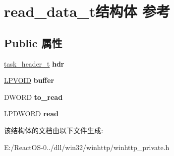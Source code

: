 \hypertarget{structread__data__t}{}\section{read\+\_\+data\+\_\+t结构体 参考}
\label{structread__data__t}
\subsection*{Public 属性}
\begin{DoxyCompactItemize}
\item 
\mbox{\label{structread__data__t_a24a4f40a354f6f671183c254c717ccd1}} 
\hyperlink{structtask__header__t}{task\+\_\+header\+\_\+t} {\bfseries hdr}
\item 
\mbox{\label{structread__data__t_a29365ea42a9ae8098fd194dc5c13306a}} 
\hyperlink{interfacevoid}{L\+P\+V\+O\+ID} {\bfseries buffer}
\item 
\mbox{\label{structread__data__t_a357ab17a0c1e06f7b7af10fcfecd2c87}} 
D\+W\+O\+RD {\bfseries to\+\_\+read}
\item 
\mbox{\label{structread__data__t_a6b28a7fb7bdc7dc0edab585ceeaa9d8f}} 
L\+P\+D\+W\+O\+RD {\bfseries read}
\end{DoxyCompactItemize}


该结构体的文档由以下文件生成\+:\begin{DoxyCompactItemize}
\item 
E\+:/\+React\+O\+S-\/0../dll/win32/winhttp/winhttp\+\_\+private.\+h\end{DoxyCompactItemize}
